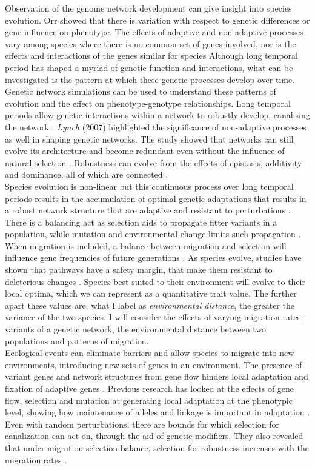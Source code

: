 Observation of the genome network development can give insight into species evolution. Orr showed that there is variation with respect to genetic differences or gene influence on phenotype. The effects of adaptive and non-adaptive processes vary among species where there is no common set of genes involved, nor is the effects and interactions of the genes similar for species \cite{orr1998population} Although long temporal period has shaped a myriad of genetic function and interactions, what can be investigated is the pattern at which these genetic processes develop over time. Genetic network simulations can be used to understand these patterns of evolution and the effect on phenotype-genotype relationships. Long temporal periods allow genetic interactions within a network to robustly develop, canalising the network \cite{orr1998population,lynch2007evolution}. \textit{Lynch} (2007) highlighted the significance of non-adaptive processes as well in shaping genetic networks. The study showed that networks can still evolve its architecture and become redundant even without the influence of natural selection \cite{lynch2007evolution}. Robustness can evolve from the effects of epistasis, additivity and dominance, all of which are connected \cite{omholt2000gene}.\\
Species evolution is non-linear but this continuous process over long temporal periods results in the accumulation of optimal genetic adaptations that results in a robust network structure that are adaptive and resistant to perturbations \cite{hinman2009evolution}. There is a balancing act as selection aids to propagate fitter variants in a population, while mutation and environmental change limits such propagation \cite{burt1995evolution}. When migration is included, a balance between migration and selection will influence gene frequencies of future generations \cite{brown1992evolution}. As species evolve, studies have shown that pathways have a safety margin, that make them resistant to deleterious changes \cite{bourguet1999evolution}. Species best suited to their environment will evolve to their local optima, which we can represent as a quantitative trait value. The further apart these values are, what I label as \textit{environmental distance}, the greater the variance of the two species. I will consider the effects of varying migration rates, variants of a genetic network, the environmental distance between two populations and patterns of migration.\\
Ecological events can eliminate barriers and allow species to migrate into new environments, introducing new sets of genes in an environment. The presence of variant genes and network structures from gene flow hinders local adaptation and fixation of adaptive genes \cite{burt1995evolution}. Previous research has looked at the effects of gene flow, selection and mutation at generating local adaptation at the phenotypic level, showing how maintenance of alleles and linkage is important in adaptation \cite{yeaman2011genetic}. Even with random perturbations, there are bounds for which selection for canalization can act on, through the aid of genetic modifiers. They also revealed that under migration selection balance, selection for robustness increases with the migration rates \cite{proulx2005opportunity}.\\
